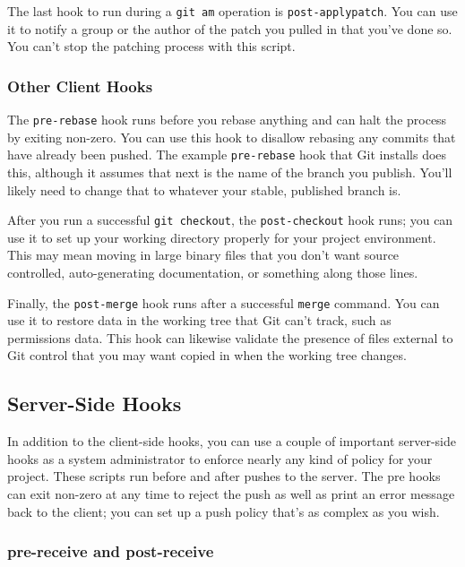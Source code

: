 \documentclass[a4paper]{book}
\newcounter{tab}[chapter]
\begin{document}
The last hook to run during a \texttt{git am} operation is \texttt{post-applypatch}. You can use it to notify a group or the author of the patch you pulled in that you've done so. You can't stop the patching process with this script.

\subsubsection{Other Client Hooks}

The \texttt{pre-rebase} hook runs before you rebase anything and can halt the process by exiting non-zero. You can use this hook to disallow rebasing any commits that have already been pushed. The example \texttt{pre-rebase} hook that Git installs does this, although it assumes that next is the name of the branch you publish. You'll likely need to change that to whatever your stable, published branch is.

After you run a successful \texttt{git checkout}, the \texttt{post-checkout} hook runs; you can use it to set up your working directory properly for your project environment. This may mean moving in large binary files that you don't want source controlled, auto-generating documentation, or something along those lines.

Finally, the \texttt{post-merge} hook runs after a successful \texttt{merge} command. You can use it to restore data in the working tree that Git can't track, such as permissions data. This hook can likewise validate the presence of files external to Git control that you may want copied in when the working tree changes.

\subsection{Server-Side Hooks}

In addition to the client-side hooks, you can use a couple of important server-side hooks as a system administrator to enforce nearly any kind of policy for your project. These scripts run before and after pushes to the server. The pre hooks can exit non-zero at any time to reject the push as well as print an error message back to the client; you can set up a push policy that's as complex as you wish.

\subsubsection{pre-receive and post-receive}
\end{document}

